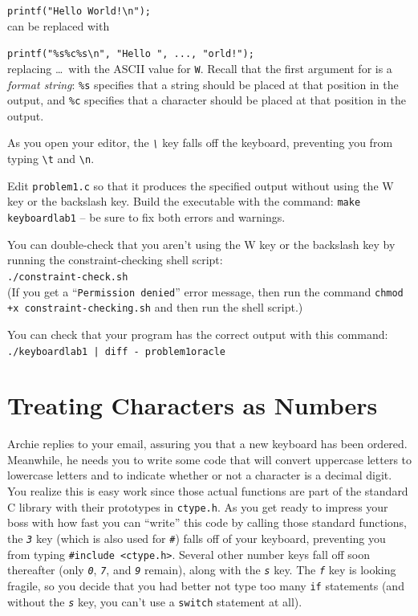 \lstinline{printf("Hello World!\n");} \\
can be replaced with

\lstinline{printf("%s%c%s\n", "Hello ", ..., "orld!");} \\
replacing \dots\ with the ASCII value for \texttt{W}. Recall that the first
argument for  is a \textit{format string}: \texttt{\%s}
specifies that a string should be placed at that position in the output, and
\texttt{\%c} specifies that a character should be placed at that position in
the output.

As you open your editor, the \textit{\texttt{\textbackslash}} key falls off the
keyboard, preventing you from typing \texttt{\textbackslash t} and
\texttt{\textbackslash n}.

Edit \texttt{problem1.c} so that it produces the specified output without using
the W key or the backslash key. Build the executable with the command:
\texttt{make keyboardlab1} -- be sure to fix both errors and warnings.

You can double-check that you aren't using the W key or the backslash key by
running the constraint-checking shell script: \\
\texttt{./constraint-check.sh} \\
(If you get a ``\texttt{Permission denied}'' error message, then run the
command \texttt{chmod +x constraint-checking.sh} and then run the shell script.)

You can check that your program has the correct output with this command: \\
\texttt{./keyboardlab1 | diff - problem1oracle}


\section{Treating Characters as Numbers}

Archie replies to your email, assuring you that a new keyboard has been
ordered. Meanwhile, he needs you to write some code that will convert uppercase
letters to lowercase letters and to indicate whether or not a character is a
decimal digit. You realize this is easy work since those actual functions are
part of the standard C library with their prototypes in \texttt{ctype.h}. As
you get ready to impress your boss with how fast you can ``write'' this code by
calling those standard functions, the \textit{\texttt{3}} key (which is also
used for \textit{\texttt{\#}}) falls off of your keyboard, preventing you from
typing \lstinline{#include <ctype.h>}. Several other number keys fall off soon
thereafter (only \textit{\texttt{0}}, \textit{\texttt{7}}, and
\textit{\texttt{9}} remain), along with the \textit{\texttt{s}} key. The
\textit{\texttt{f}} key is looking fragile, so you decide that you had better
not type too many \lstinline{if} statements (and without the
\textit{\texttt{s}} key, you can't use a \lstinline{switch} statement at all).

